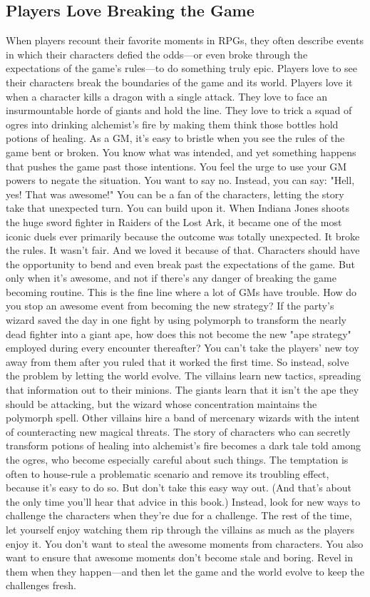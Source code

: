 \documentclass[10pt,a4paper,twoside,bg=print,twocolumn,openany,nodeprecatedcode]{dndbook}
\begin{document}
\subsection{Players Love Breaking the Game}
When players recount their favorite moments in RPGs, they often describe events in which their characters defied the odds—or even broke through the expectations of the game's rules—to do something truly epic. Players love to see their characters break the boundaries of the game and its world.
Players love it when a character kills a dragon with a single attack. They love to face an insurmountable horde of giants and hold the line. They love to trick a squad of ogres into drinking alchemist's fire by making them think those bottles hold potions of healing.
As a GM, it's easy to bristle when you see the rules of the game bent or broken. You know what was intended, and yet something happens that pushes the game past those intentions. You feel the urge to use your GM powers to negate the situation. You want to say no.
Instead, you can say: "Hell, yes! That was awesome!" You can be a fan of the characters, letting the story take that unexpected turn. You can build upon it.
When Indiana Jones shoots the huge sword fighter in Raiders of the Lost Ark, it became one of the most iconic duels ever primarily because the outcome was totally unexpected. It broke the rules. It wasn't fair. And we loved it because of that.
Characters should have the opportunity to bend and even break past the expectations of the game. But only when it's awesome, and not if there's any danger of breaking the game becoming routine.
This is the fine line where a lot of GMs have trouble. How do you stop an awesome event from becoming the new strategy? If the party's wizard saved the day in one fight by using polymorph to transform the nearly dead fighter into a giant ape, how does this not become the new "ape strategy" employed during every encounter thereafter? You can't take the players' new toy away from them after you ruled that it worked the first time. So instead, solve the problem by letting the world evolve.
The villains learn new tactics, spreading that information out to their minions. The giants learn that it isn't the ape they should be attacking, but the wizard whose concentration maintains the polymorph spell. Other villains hire a band of mercenary wizards with the intent of counteracting new magical threats. The story of characters who can secretly transform potions of healing into alchemist's fire becomes a dark tale told among the ogres, who become especially careful about such things.
The temptation is often to house-rule a problematic scenario and remove its troubling effect, because it's easy to do so. But don't take this easy way out. (And that's about the only time you'll hear that advice in this book.) Instead, look for new ways to challenge the characters when they're due for a challenge. The rest of the time, let yourself enjoy watching them rip through the villains as much as the players enjoy it.
You don't want to steal the awesome moments from characters. You also want to ensure that awesome moments don't become stale and boring. Revel in them when they happen—and then let the game and the world evolve to keep the challenges fresh.
\end{document}
